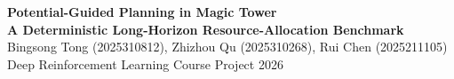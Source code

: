 \documentclass[10pt]{article}
\begin{document}
\fontsize{14}{17}\selectfont

\vspace*{1.35in}

\begin{center}
{\fontsize{54}{62}\selectfont\bfseries\color{primary}
Potential-Guided Planning in Magic Tower}\\[0.20in]
{\fontsize{30}{36}\selectfont\bfseries
A Deterministic Long-Horizon Resource-Allocation Benchmark}\\[0.32in]
{\fontsize{20}{25}\selectfont
Bingsong Tong (2025310812), Zhizhou Qu (2025310268), Rui Chen (2025211105)}\\[0.12in]
{\fontsize{17}{22}\selectfont Deep Reinforcement Learning Course Project 2026}
\end{center}

\vspace{0.35in}
\end{document}
